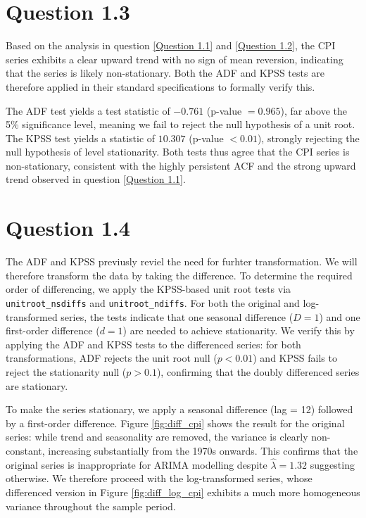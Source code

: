 
\section{Question 1.3} \label{Question 1.3}
Based on the analysis in question \ref{Question 1.1} and \ref{Question 1.2}, the CPI series exhibits a clear upward trend with no sign of mean reversion, indicating that the series is likely non-stationary. Both the ADF and KPSS tests are therefore applied in their standard specifications to formally verify this.

The ADF test yields a test statistic of $-0.761$ (p-value $= 0.965$), far above the 
5\% significance level, meaning we fail to reject the null hypothesis of a unit root. 
The KPSS test yields a statistic of $10.307$ (p-value $< 0.01$), strongly rejecting 
the null hypothesis of level stationarity. Both tests thus agree that the CPI series is non-stationary, consistent with the highly persistent ACF and the strong 
upward trend observed in question \ref{Question 1.1}.

\section{Question 1.4} \label{Question 1.4}
The ADF and KPSS previusly reviel the need for furhter transformation. We will therefore transform the data by taking the difference. To determine the required order of differencing, we apply the KPSS-based unit root tests via \texttt{unitroot\_nsdiffs} and \texttt{unitroot\_ndiffs}. For both the original and log-transformed series, the tests indicate that one seasonal difference ($D = 1$) and one first-order difference ($d = 1$) are needed to achieve stationarity. We verify this by applying the ADF and KPSS tests to the differenced series: for both transformations, ADF rejects the unit root null ($p < 0.01$) and KPSS fails to reject the stationarity null ($p > 0.1$), confirming that the doubly differenced series are stationary.

To make the series stationary, we apply a seasonal difference (lag = 12) followed by a first-order difference. Figure \ref{fig:diff_cpi} shows the result for the original series: while trend and seasonality are removed, the variance is clearly non-constant, increasing substantially from the 1970s onwards. This confirms that the original series is inappropriate for ARIMA modelling despite $\hat{\lambda} = 1.32$ suggesting otherwise. We therefore proceed with the log-transformed series, whose differenced version in Figure \ref{fig:diff_log_cpi} exhibits a much more homogeneous variance throughout the sample period.

